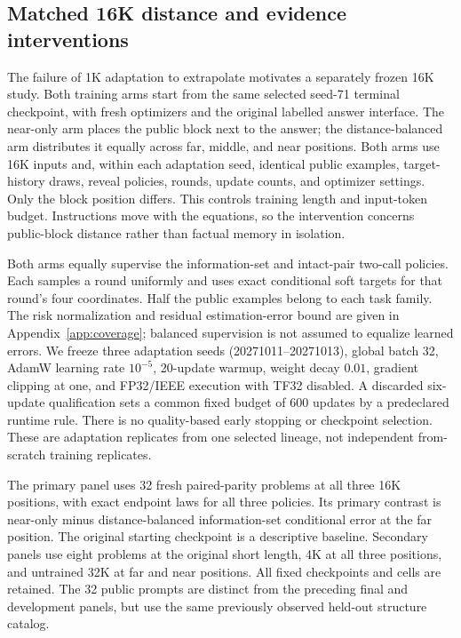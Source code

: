 \subsection{Matched 16K distance and evidence interventions}
\label{sec:distance-design}
The failure of 1K adaptation to extrapolate motivates a separately frozen
16K study. Both training arms start from the same selected seed-71 terminal
checkpoint, with fresh optimizers and the original labelled answer interface.
The near-only arm places the public block next to the answer; the
distance-balanced arm distributes it equally across far, middle, and near
positions. Both arms use 16K inputs and, within each adaptation seed, identical
public examples, target-history draws, reveal policies, rounds, update counts,
and optimizer settings. Only the block position differs. This controls
training length and input-token budget. Instructions move with the equations,
so the intervention concerns public-block distance rather than factual memory
in isolation.

Both arms equally supervise the information-set and intact-pair two-call
policies. Each samples a round uniformly and uses exact conditional soft
targets for that round's four coordinates. Half the public examples belong
to each task family. The risk normalization and residual estimation-error
bound are given in Appendix~\ref{app:coverage}; balanced supervision is not
assumed to equalize learned errors. We freeze three adaptation seeds
(20271011--20271013), global batch 32, AdamW learning rate $10^{-5}$,
20-update warmup, weight decay $0.01$, gradient clipping at one, and
FP32/IEEE execution with TF32 disabled. A discarded six-update qualification
sets a common fixed budget of 600 updates by a predeclared runtime rule.
There is no quality-based early stopping or checkpoint selection. These
are adaptation replicates from one selected lineage, not independent
from-scratch training replicates.

The primary panel uses 32 fresh paired-parity problems at all three 16K
positions, with exact endpoint laws for all three policies. Its primary
contrast is near-only minus distance-balanced information-set conditional
error at the far position. The original starting checkpoint is a descriptive
baseline. Secondary panels use eight problems at the original short length,
4K at all three positions, and untrained 32K at far and near positions.
All fixed checkpoints and cells are retained. The 32 public prompts are
distinct from the preceding final and development panels, but use the same
previously observed held-out structure catalog.

